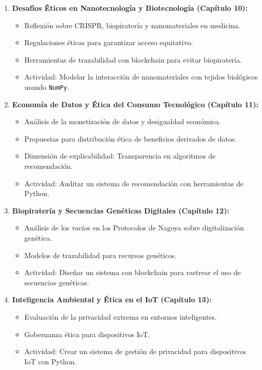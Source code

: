 \begin{refsection}
\begin{enumerate}
\item \textbf{Desafíos Éticos en Nanotecnología y Biotecnología (Capítulo 10):}  
\begin{itemize}
    \item Reflexión sobre CRISPR, biopiratería y nanomateriales en medicina.
    \item Regulaciones éticas para garantizar acceso equitativo.
    \item Herramientas de trazabilidad con blockchain para evitar biopiratería.
    \item Actividad: Modelar la interacción de nanomateriales con tejidos biológicos usando \texttt{NumPy}.
\end{itemize}

\item \textbf{Economía de Datos y Ética del Consumo Tecnológico (Capítulo 11):}  
\begin{itemize}
    \item Análisis de la monetización de datos y desigualdad económica.
    \item Propuestas para distribución ética de beneficios derivados de datos.
    \item Dimensión de explicabilidad: Transparencia en algoritmos de recomendación.
    \item Actividad: Auditar un sistema de recomendación con herramientas de Python.
\end{itemize}

\item \textbf{Biopiratería y Secuencias Genéticas Digitales (Capítulo 12):}  
\begin{itemize}
    \item Análisis de los vacíos en los Protocolos de Nagoya sobre digitalización genética.
    \item Modelos de trazabilidad para recursos genéticos.
    \item Actividad: Diseñar un sistema con blockchain para rastrear el uso de secuencias genéticas.
\end{itemize}

\item \textbf{Inteligencia Ambiental y Ética en el IoT (Capítulo 13):}  
\begin{itemize}
    \item Evaluación de la privacidad extrema en entornos inteligentes.
    \item Gobernanza ética para dispositivos IoT.
    \item Actividad: Crear un sistema de gestión de privacidad para dispositivos IoT con Python.
\end{itemize}


\end{enumerate}
\end{refsection}
